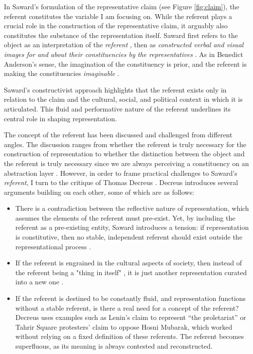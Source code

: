 In Saward's formulation of the representative claim (see Figure \ref{fig:claim}), the referent constitutes the variable I am focusing on. While the referent plays a crucial role in the construction of the representative claim, it arguably also constitutes the substance of the representation itself. Saward first refers to the object as an interpretation of the \textit{referent} \parencite[see 49]{saward2010}, then as \textit{constructed verbal and visual images for and about their constituencies by the representatives} \parencite[51]{saward2010}. As in Benedict Anderson's \parencite[]{anderson2005} sense, the imagination of the constituency is prior, and the referent is making the constituencies \textit{imaginable} \parencite[see 49]{saward2010}.

Saward’s constructivist approach highlights that the referent exists only in relation to the claim and the cultural, social, and political context in which it is articulated. This fluid and performative nature of the referent underlines its central role in shaping representation.

The concept of the referent has been discussed and challenged from different
angles. The discussion ranges from whether the referent is truly necessary for the
construction of representation  to whether
the distinction between the object and the referent is truly necessary since we are
always perceiving a constituency on an abstraction layer . However, in order to frame practical challenges to Saward's
\textit{referent}, I turn to the critique of Thomas Decreus
\cite*{decreus2013}. Decreus introduces several arguments building on each
other, some of which are as follows:

\begin{itemize}
	\item There is a contradiction between the reflective nature of
	      representation, which assumes the elements of the referent must pre-exist.
	      Yet, by including the referent as a pre-existing entity, Saward introduces
	      a tension: if representation is constitutive, then no stable, independent
	      referent should exist outside the representational process \parencite[37]{decreus2013}.
	\item If the referent is engrained in the cultural aspects of society,
	      then instead of the referent being a "thing in itself" \parencite[]{saward2008}, it is just another representation curated into a new one \parencite[38]{decreus2013}.
	\item If the referent is destined to be constantly fluid, and representation functions without a stable referent, is there a real need for a concept of the referent? Decreus uses examples such as Lenin’s claim to represent “the proletariat” or Tahrir Square protesters’ claim to oppose Hosni Mubarak, which worked without relying on a fixed definition of these referents. The referent becomes superfluous, as its meaning is always contested and reconstructed.
\end{itemize}

